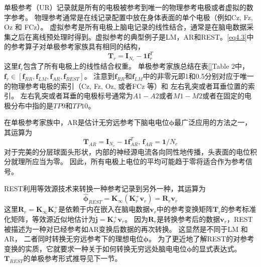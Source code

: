 单极参考（UR）记录就是所有的电极被参考到唯一的物理参考电极或者虚拟的数字参考。 物理参考通常是在线记录配置中放在身体表面的单个电极（例如Cz, Fz, Oz 和 FCz）。 虚拟参考是所有电极上脑电记录的线性结合，通常是在脑电数据采集之后在离线预处理时得到。虚拟参考的典型例子是LM，AR和REST。\eqref{eq4.3}中的参考算子对单极参考家族具有相同的结构，
\begin{equation}\label{eq4.4}
\mathbf{T}_{r}=\mathbf{I}_{N_c}-\mathbf{1f}_r^T
\end{equation}
这里$\mathbf{f}_r$包含了所有电极上的线性结合权重。 单极参考家族总结在表\ref{}Table 2中，$\mathbf{f}_r\in{[\mathbf{f}_{RR},\mathbf{f}_{LM},\mathbf{f}_{AR},\mathbf{f}_{REST}]}$。 注意到$\mathbf{f}_{RR}$和$\mathbf{f}_{LM}$中的非零元即1和0.5分别对应于唯一的物理参考电极的索引（Cz, Fz, Oz, 或者FCz 等）和 左右乳突或者耳垂位置的索引。 左右乳突或者耳垂的电极标号通常为$A1-A2$或者$M1-M2$或者在固定的电极分布中指的是$TP9$和$TP10$。

在单极参考家族中，AR是估计无穷远参考下脑电电位$\mathbf{\phi}$最广泛应用的方法之一，其运算为
\begin{equation}\label{eq4.5}
\mathbf{T}_{AR}=\mathbf{I}_{N_c}-\mathbf{1f}_{AR}^T,\,\mathbf{f}_{AR}=\mathbf{1}/{N_c}
\end{equation}
对于完美的分层球面头形状，内部的神经源电流各向同性地传播，头表面的电位积分就理所应当为零。 因此，所有电极上电位的平均可能趋于零将适合作为参考信号。

REST利用等效源技术来转换一种参考记录到另外一种，其运算为
\begin{equation}\label{eq4.6}
\hat{\mathbf{\phi}}_{REST}=\mathbf{K}_{\infty}(\mathbf{K}_r^+\mathbf{v}_r)=\mathbf{R}_r\mathbf{v}_r
\end{equation}
这里$\mathbf{R}_r=\mathbf{K}_{\infty}\mathbf{K}_r^+$是依赖于内在嵌入在脑电数据$\mathbf{v}_r$中的参考变换矩阵$\mathbf{T}_r$的参考标准化矩阵，等效源近似地估计为$\hat{\mathbf{j}}=\mathbf{K}_r^+\mathbf{v}_r$。 因为$\mathbf{R}_r$是转换参考后的数据$\mathbf{v}_r$，REST被描述为一种对已经参考如AR变换后数据的再次转换。 这显然是不同于LM 和 AR， 二者同时转换无穷远参考下的理想电位$\mathbf{\phi}$。 为了更近地了解REST的对参考变换的实质，它就要求一种关于如何转换无穷远处脑电电位$\mathbf{\phi}$的显式表达式。 $\mathbf{T}_{REST}$的单极参考形式推导见下一节。

